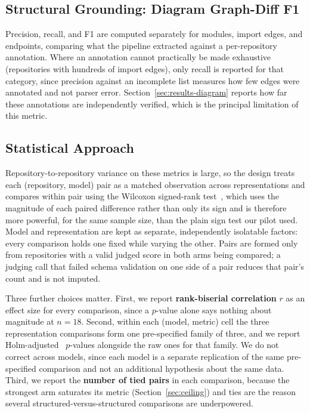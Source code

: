 \documentclass[conference]{IEEEtran}
\begin{document}
\subsection{Structural Grounding: Diagram Graph-Diff F1}
Precision, recall, and F1 are computed separately for modules, import edges, and endpoints,
comparing what the pipeline extracted against a per-repository annotation. Where an annotation
cannot practically be made exhaustive (repositories with hundreds of import edges), only recall
is reported for that category, since precision against an incomplete list measures how few edges
were annotated and not parser error. Section~\ref{sec:results-diagram} reports how far these
annotations are independently verified, which is the principal limitation of this metric.

\subsection{Statistical Approach}
Repository-to-repository variance on these metrics is large, so the design treats each
(repository, model) pair as a matched observation across representations and compares within
pair using the Wilcoxon signed-rank test~\cite{wilcoxon1945individual}, which uses the magnitude
of each paired difference rather than only its sign and is therefore more powerful, for the same
sample size, than the plain sign test our pilot used. Model and representation are kept as
separate, independently isolatable factors: every comparison holds one fixed while varying the
other. Pairs are formed only from repositories with a valid judged score in both arms being
compared; a judging call that failed schema validation on one side of a pair reduces that pair's
count and is not imputed.

Three further choices matter. First, we report \textbf{rank-biserial correlation} $r$ as an
effect size for every comparison, since a $p$-value alone says nothing about magnitude at
$n=18$. Second, within each (model, metric) cell the three representation comparisons form one
pre-specified family of three, and we report Holm-adjusted~\cite{holm1979simple} $p$-values
alongside the raw ones for that family. We do not correct across models, since each model is a
separate replication of the same pre-specified comparison and not an additional hypothesis about
the same data. Third, we report the \textbf{number of tied pairs} in each comparison, because
the strongest arm saturates its metric (Section~\ref{sec:ceiling}) and ties are the reason
several structured-versus-structured comparisons are underpowered.
\end{document}
